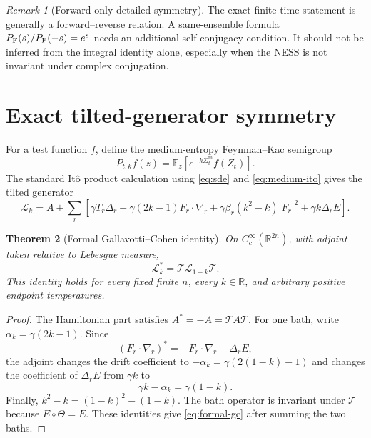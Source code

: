 \documentclass[11pt]{article}
\newtheorem{theorem}{Theorem}[section]
\theoremstyle{remark}
\newtheorem{remark}[theorem]{Remark}
\newcommand{\R}{\mathbb R}
\newcommand{\E}{\mathbb E}
\newcommand{\grad}{\nabla}
\newcommand{\cL}{\mathcal L}
\newcommand{\Thetaop}{\mathcal T}
\newcommand{\SigmaM}{\Sigma^{\mathrm m}}
\begin{document}
\begin{remark}[Forward-only detailed symmetry]
The exact finite-time statement is generally a forward--reverse relation.
A same-ensemble formula $P_{\rm F}(s)/P_{\rm F}(-s)=e^s$ needs an additional
self-conjugacy condition.  It should not be inferred from the integral
identity alone, especially when the NESS is not invariant under complex
conjugation.
\end{remark}

\section{Exact tilted-generator symmetry}

For a test function $f$, define the medium-entropy Feynman--Kac semigroup
\[
 P_{t,k}f(z)=\E_z\!\left[e^{-k\SigmaM_t}f(Z_t)\right].
\]
The standard It\^o product calculation using \eqref{eq:sde} and
\eqref{eq:medium-ito} gives the tilted generator
\begin{equation}\label{eq:tilted}
 \boxed{
 \cL_k=A+\sum_r\left[
 \gamma T_r\Delta_r
 +\gamma(2k-1)F_r\cdot\grad_r
 +\gamma\beta_r(k^2-k)|F_r|^2
 +\gamma k\Delta_rE
 \right]. }
\end{equation}

\begin{theorem}[Formal Gallavotti--Cohen identity]\label{thm:formal-gc}
On $C_c^\infty(\R^{2n})$, with adjoint taken relative to Lebesgue measure,
\begin{equation}\label{eq:formal-gc}
 \boxed{\cL_k^*=\Thetaop\cL_{1-k}\Thetaop.}
\end{equation}
This identity holds for every fixed finite $n$, every $k\in\R$, and arbitrary
positive endpoint temperatures.
\end{theorem}

\begin{proof}
The Hamiltonian part satisfies $A^*=-A=\Thetaop A\Thetaop$.  For one bath,
write $\alpha_k=\gamma(2k-1)$.  Since
\[
 (F_r\cdot\grad_r)^*=-F_r\cdot\grad_r-\Delta_rE,
\]
the adjoint changes the drift coefficient to
$-\alpha_k=\gamma(2(1-k)-1)$ and changes the coefficient of
$\Delta_rE$ from $\gamma k$ to
\[
 \gamma k-\alpha_k=\gamma(1-k).
\]
Finally,
$k^2-k=(1-k)^2-(1-k)$.  The bath operator is invariant under $\Thetaop$
because $E\circ\Theta=E$.  These identities give \eqref{eq:formal-gc} after
summing the two baths.
\end{proof}
\end{document}
